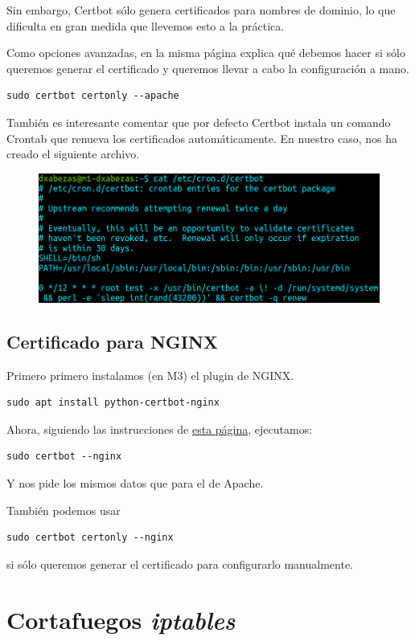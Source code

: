 \documentclass{article}
\begin{document}
Sin embargo, Certbot sólo genera certificados para nombres de dominio, lo que dificulta en gran medida que llevemos esto a la práctica.

Como opciones avanzadas, en la misma página explica qué debemos hacer si sólo queremos generar el certificado y queremos llevar a
cabo la configuración a mano.
\begin{Verbatim}
sudo certbot certonly --apache 
\end{Verbatim}
También es interesante comentar que por defecto Certbot instala un comando Crontab que renueva los certificados automáticamente.
En nuestro caso, nos ha creado el siguiente archivo.

\begin{figure}[H]
	\centering
	\includegraphics[width=140mm]{imgs/renew-crontab}
	\label{fig:renew-crontab}
\end{figure}

\subsection{Certificado para NGINX}

Primero primero instalamos (en M3) el plugin de NGINX.

\begin{Verbatim}
sudo apt install python-certbot-nginx
\end{Verbatim}

Ahora, siguiendo las instrucciones de \href{https://certbot.eff.org/lets-encrypt/ubuntubionic-nginx}{esta página}, ejecutamos:
\begin{Verbatim}
sudo certbot --nginx
\end{Verbatim}
Y nos pide los mismos datos que para el de Apache.

También podemos usar 
\begin{Verbatim}
sudo certbot certonly --nginx 
\end{Verbatim}
si sólo queremos generar el certificado para configurarlo manualmente.

\section{Cortafuegos \emph{iptables}}
\end{document}
